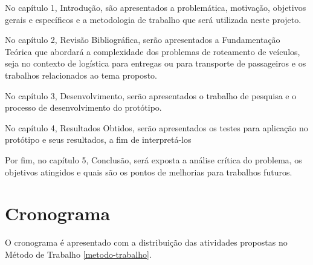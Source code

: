 No capítulo 1, Introdução, são apresentados  a problemática, motivação, objetivos gerais e específicos e a metodologia de trabalho que será utilizada neste projeto.

No capítulo 2, Revisão Bibliográfica, serão apresentados a Fundamentação Teórica que abordará a complexidade dos problemas de roteamento de veículos, seja no contexto de logística para entregas ou para transporte de passageiros e os trabalhos relacionados ao tema proposto. 

No capítulo 3, Desenvolvimento, serão apresentados o trabalho de pesquisa e o processo de desenvolvimento do protótipo.

No capítulo 4, Resultados Obtidos, serão apresentados os testes para aplicação no protótipo e seus resultados, a fim de interpretá-los  

Por fim, no capítulo 5, Conclusão, será exposta a análise crítica do problema, os objetivos atingidos e quais são os pontos de melhorias para trabalhos futuros.

\newpage
\section{Cronograma}
O cronograma é apresentado com a distribuição das atividades propostas no Método de Trabalho \ref{metodo-trabalho}.

 